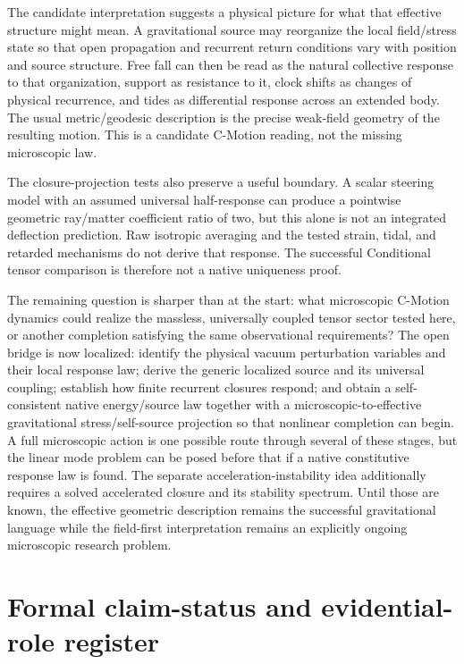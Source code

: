 \documentclass[11pt]{article}
\newcommand{\cmotion}{\mbox{C-Motion}}
\theoremstyle{plain}
\theoremstyle{remark}
\begin{document}
The candidate interpretation suggests a physical picture for what that
effective structure might mean.  A gravitational source may reorganize the local
field/stress state so that open propagation and recurrent return conditions vary with
position and source structure.  Free fall can then be read as the natural collective
response to that organization, support as resistance to it, clock shifts as changes of
physical recurrence, and tides as differential response across an extended body.  The
usual metric/geodesic description is the precise weak-field geometry of the resulting
motion.  This is a candidate \cmotion{} reading, not the missing microscopic law.

The closure-projection tests also preserve a useful boundary.  A scalar
steering model with an assumed universal half-response can produce a
pointwise geometric ray/matter coefficient ratio of two, but this alone
is not an integrated deflection prediction.  Raw isotropic averaging and the tested
strain, tidal, and retarded mechanisms do not derive that response.
The successful Conditional tensor comparison is therefore not a native
uniqueness proof.

The remaining question is sharper than at the start: what microscopic
\cmotion{} dynamics could realize the massless, universally coupled
tensor sector tested here, or another completion satisfying the same
observational requirements?  The open bridge is now localized: identify the
physical vacuum perturbation variables and their local response law; derive the generic
localized source and its universal coupling; establish how finite recurrent closures respond;
and obtain a self-consistent native energy/source law together with a
microscopic-to-effective gravitational stress/self-source projection so that
nonlinear completion can begin.  A full microscopic action is one possible route through several of
these stages, but the linear mode problem can be posed before that if a native constitutive
response law is found.  The separate acceleration-instability idea additionally requires a
solved accelerated closure and its stability spectrum.  Until those are known, the effective
geometric description remains the successful gravitational language while the field-first
interpretation remains an explicitly ongoing microscopic research problem.

\newpage
\appendix
\section{Formal claim-status and evidential-role register}
\label{app:status}
\end{document}

